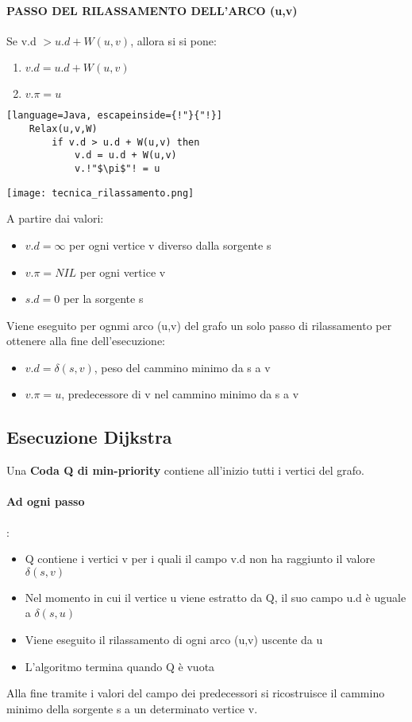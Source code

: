 \paragraph*{PASSO DEL RILASSAMENTO DELL'ARCO (u,v)} Se v.d $> u.d + W(u,v)$, allora si 
si pone:
\begin{enumerate}
    \item $v.d = u.d + W(u,v)$
    \item $v.\pi = u$
\end{enumerate}
\begin{lstlisting}[language=Java, escapeinside={!"}{"!}]
    Relax(u,v,W)
        if v.d > u.d + W(u,v) then
            v.d = u.d + W(u,v)
            v.!"$\pi$"! = u
\end{lstlisting}
\begin{center}
    \texttt{[image: tecnica\_rilassamento.png]}
\end{center}
A partire dai valori:
\begin{itemize}
    \item $v.d = \infty$ per ogni vertice v diverso dalla sorgente s
    \item $v.\pi = NIL$ per ogni vertice v
    \item $s.d = 0$ per la sorgente s
\end{itemize}
Viene eseguito per ognmi arco (u,v) del grafo un solo passo di rilassamento
per ottenere alla fine dell'esecuzione:
\begin{itemize}
    \item $v.d = \delta(s,v)$, peso del cammino minimo da s a v
    \item $v.\pi = u$, predecessore di v nel cammino minimo da s a v
\end{itemize}
\subsection{Esecuzione Dijkstra}
Una \textbf{Coda Q di min-priority} contiene all'inizio tutti i vertici del grafo.
\paragraph*{Ad ogni passo}:
\begin{itemize}
    \item Q contiene i vertici v per i quali il campo v.d non ha raggiunto il valore $\delta(s,v)$
    \item Nel momento in cui il vertice u viene estratto da Q, il suo campo u.d è uguale a $\delta(s,u)$
    \item Viene eseguito il rilassamento di ogni arco (u,v) uscente da u
    \item L'algoritmo termina quando Q è vuota
\end{itemize}
Alla fine tramite i valori del campo dei predecessori si ricostruisce il cammino
minimo della sorgente s a un determinato vertice v.
